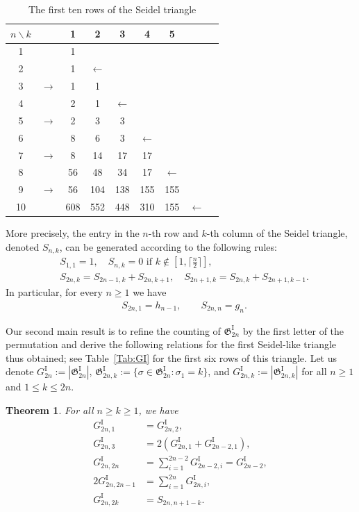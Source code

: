 \documentclass[11pt,reqno]{amsart}
\numberwithin{equation}{section}
\theoremstyle{plain}
\newtheorem{theorem}{Theorem}[section]
\theoremstyle{definition}
\newcommand{\fG}{\mathfrak{G}}
\newcommand{\GI}{\fG^{\mathrm{I}}}
\newcommand{\Gi}{G^{\mathrm{I}}}
\begin{document}
\begin{table}[ht]
    
    \centering
    \begin{tabular}{c|cccccccc}
    	$n \backslash k$ & & 1 & 2 & 3 & 4 & 5  \\ \hline
         1 & & 1 & & & & \\ 
         2 & & 1 & $\leftarrow$ & & & \\ 
    3&$\rightarrow$& 1 & 1 & & &  \\ 
         4 & & 2 & 1 & $\leftarrow$ & &  \\ 
    5&$\rightarrow$& 2 & 3 & 3 & &  \\ 
         6 & & 8 & 6 & 3 & $\leftarrow$ & \\
    7&$\rightarrow$& 8 & 14 & 17 & 17 &  \\ 
         8 & & 56 & 48 & 34 & 17 & $\leftarrow$ \\
    9&$\rightarrow$& 56 & 104 & 138 & 155 & 155 \\
         10 & & 608 & 552 & 448 & 310 & 155 & $\leftarrow$ \\
    \end{tabular}
    \medskip
    \caption{The first ten rows of the Seidel triangle} \label{Tab:Seidel triangle}
\end{table}

More precisely, the entry in the $n$-th row and $k$-th column of the Seidel triangle, denoted $S_{n,k}$, can be generated according to the following rules:
\begin{align}
	& S_{1,1} = 1,\quad S_{n,k} = 0 \text{ if $k\not\in [1,\lceil\frac{n}{2}\rceil]$,}\nonumber \\
	& S_{2n,k} = S_{2n-1,k}+S_{2n,k+1},\quad S_{2n+1,k} = S_{2n,k}+S_{2n+1,k-1}.\label{Seidel rule}
\end{align}
In particular, for every $n\ge 1$ we have
\begin{align}\label{id:Seidel two Genocchi}
& S_{2n,1} = h_{n-1}, \qquad S_{2n,n}=g_n.
\end{align}

Our second main result is to refine the counting of $\GI_{2n}$ by the first letter of the permutation and derive the following relations for the first Seidel-like triangle thus obtained; see Table~\ref{Tab:GI} for the first six rows of this triangle. Let us denote $\Gi_{2n}:=|\GI_{2n}|$, $\GI_{2n,k}:=\{\sigma\in\GI_{2n}: \sigma_1=k\}$, and $\Gi_{2n,k}:=|\GI_{2n,k}|$ for all $n\ge 1$ and $1\le k\le 2n$.

\begin{theorem} \label{thm:GIS}
For all $n\ge k\ge 1$, we have
\begin{align}
\Gi_{2n,1} &= \Gi_{2n,2},\label{id:1=2}\\
\Gi_{2n,3} &= 2(\Gi_{2n,1}+\Gi_{2n-2,1}),\label{E_3}\\
\Gi_{2n,2n} &= \sum_{i=1}^{2n-2} \Gi_{2n-2,i}=\Gi_{2n-2},\label{En2n=sum of above line} \\
2\Gi_{2n,2n-1} &= \sum_{i=1}^{2n} \Gi_{2n,i},\label{eq:GI_2n,2n-1}\\
\Gi_{2n,2k} &= S_{2n,n+1-k}. \label{id:GI and S}
\end{align}
\end{theorem}
\end{document}
